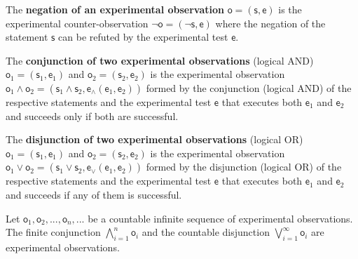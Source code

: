 \documentclass[11pt,letterpaper,fleqn]{memoir} %
\begin{document}
\begin{defn}
	The \textbf{negation of an experimental observation} $\mathsf{o}=(\mathsf{s}, \mathsf{e})$ is the experimental counter-observation $\neg \mathsf{o}=(\neg \mathsf{s}, \mathsf{e})$ where the negation of the statement $\mathsf{s}$ can be refuted by the experimental test $\mathsf{e}$.
\end{defn}

\begin{defn}
	The \textbf{conjunction of two experimental observations} (logical AND) $\mathsf{o}_1=(\mathsf{s}_1, \mathsf{e}_1)$ and  $\mathsf{o}_2=(\mathsf{s}_2, \mathsf{e}_2)$ is the experimental observation $\mathsf{o}_1 \wedge \mathsf{o}_2 =(\mathsf{s}_1 \wedge \mathsf{s}_2, \mathsf{e}_{\wedge}(\mathsf{e}_1, \mathsf{e}_2))$ formed by the conjunction (logical AND) of the respective statements and the experimental test $\mathsf{e}$ that executes both $\mathsf{e}_1$ and $\mathsf{e}_2$ and succeeds only if both are successful.
\end{defn}

\begin{defn}
	The \textbf{disjunction of two experimental observations} (logical OR) $\mathsf{o}_1=(\mathsf{s}_1, \mathsf{e}_1)$ and  $\mathsf{o}_2=(\mathsf{s}_2, \mathsf{e}_2)$ is the experimental observation $\mathsf{o}_1 \vee \mathsf{o}_2 =(\mathsf{s}_1 \vee \mathsf{s}_2, \mathsf{e}_{\vee}(\mathsf{e}_1, \mathsf{e}_2))$ formed by the disjunction (logical OR)  of the respective statements and the experimental test $\mathsf{e}$ that executes both $\mathsf{e}_1$ and $\mathsf{e}_2$ and succeeds if any of them is successful.
\end{defn}


\begin{prop}
	Let $\mathsf{o}_1, \mathsf{o}_2, ... , \mathsf{o}_n, ...$ be a countable infinite sequence of experimental observations. The finite conjunction $\bigwedge\limits_{i=1}^{n} \mathsf{o}_i$ and the countable disjunction  $\bigvee\limits_{i=1}^{\infty} \mathsf{o}_i$ are experimental observations.
\end{prop}
\end{document}
